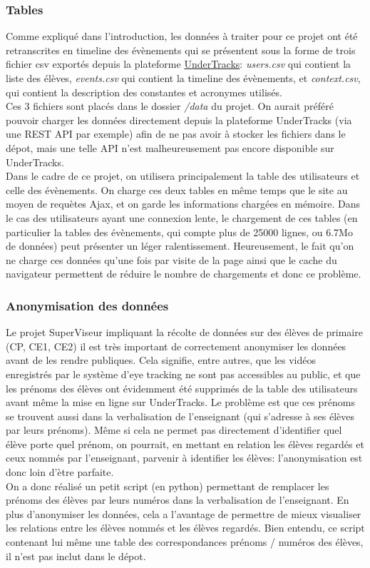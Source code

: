 \documentclass{article}
\begin{document}
\subsubsection{Tables}
Comme expliqué dans l'introduction, les données à traiter pour ce projet ont été retranscrites en timeline des évènements qui se présentent sous la forme de trois fichier csv exportés depuis la plateforme \href{https://undertracks.imag.fr/}{UnderTracks}: \textit{users.csv} qui contient la liste des élèves, \textit{events.csv} qui contient la timeline des évènements, et \textit{context.csv}, qui contient la description des constantes et acronymes utilisés.\\
Ces 3 fichiers sont placés dans le dossier \textit{/data} du projet. On aurait préféré pouvoir charger les données directement depuis la plateforme UnderTracks (via une REST API par exemple) afin de ne pas avoir à stocker les fichiers dans le dépot, mais une telle API n'est malheureusement pas encore disponible sur UnderTracks.\\
Dans le cadre de ce projet, on utilisera principalement la table des utilisateurs et celle des évènements. On charge ces deux tables en même temps que le site au moyen de requètes Ajax, et on garde les informations chargées en mémoire. Dans le cas des utilisateurs ayant une connexion lente, le chargement de ces tables (en particulier la tables des évènements, qui compte plus de 25000 lignes, ou 6.7Mo de données) peut présenter un léger ralentissement. Heureusement, le fait qu'on ne charge ces données qu'une fois par visite de la page ainsi que le cache du navigateur permettent de réduire le nombre de chargements et donc ce problème.

\subsubsection{Anonymisation des données}
Le projet SuperViseur impliquant la récolte de données sur des élèves de primaire (CP, CE1, CE2) il est très important de correctement anonymiser les données avant de les rendre publiques. Cela signifie, entre autres, que les vidéos enregistrés par le système d'eye tracking ne sont pas accessibles au public, et que les prénoms des élèves ont évidemment été supprimés de la table des utilisateurs avant même la mise en ligne sur UnderTracks. Le problème est que ces prénoms se trouvent aussi dans la verbalisation de l'enseignant (qui s'adresse à ses élèves par leurs prénoms). Même si cela ne permet pas directement d'identifier quel élève porte quel prénom, on pourrait, en mettant en relation les élèves regardés et ceux nommés par l'enseignant, parvenir à identifier les élèves: l'anonymisation est donc loin d'ètre parfaite.\\
On a donc réalisé un petit script (en python) permettant de remplacer les prénoms des élèves par leurs numéros dans la verbalisation de l'enseignant. En plus d'anonymiser les données, cela a l'avantage de permettre de mieux visualiser les relations entre les élèves nommés et les élèves regardés. Bien entendu, ce script contenant lui même une table des correspondances prénoms / numéros des élèves, il n'est pas inclut dans le dépot.
\end{document}
